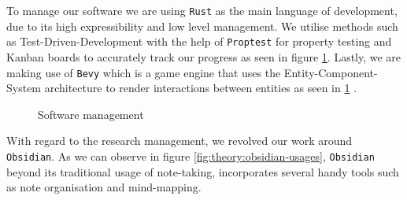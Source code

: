 To manage our software we are using \texttt{Rust}
as the main language of development, due to its high expressibility and low level management.
We utilise methods such as Test-Driven-Development with the help of \texttt{Proptest}
for property testing and Kanban boards to accurately track our progress as seen
in figure \ref{fig:soft:ecs-workflow}. Lastly, we are making use of 
\texttt{Bevy} which is a game engine that uses the Entity-Component-System
architecture to render interactions between entities as seen in \ref{fig:soft:ecs-workflow} \cite{bevyengine}.


\begin{figure}[h!]
    \centering
    \hfill
    \caption{Software management}
    \label{fig:soft:ecs-workflow}
\end{figure}

With regard to the research management, we revolved our work around \texttt{Obsidian}.
As we can observe in figure \ref{fig:theory:obsidian-usages}, 
\texttt{Obsidian} beyond its traditional usage of note-taking, incorporates several handy tools such as note organisation and mind-mapping.



